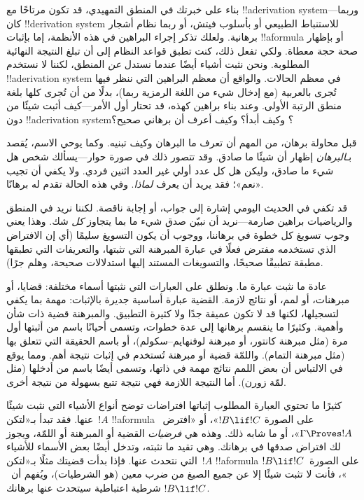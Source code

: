 \documentclass[../../../include/open-logic-section]{subfiles}
\begin{document}


بناء على خبرتك في المنطق التمهيدي، قد تكون مرتاحًا مع
!!a{derivation} system---وربما كان !!{derivation} system للاستنباط
الطبيعي أو بأسلوب فيتش، أو ربما نظام أشجار برهانية. ولعلك تذكر إجراء
البراهين في هذه الأنظمة، إما بإثبات !!a{formula} أو بإظهار صحة حجة
معطاة. ولكي تفعل ذلك، كنت تطبق قواعد النظام إلى أن تبلغ النتيجة
النهائية المطلوبة. ونحن نثبت أشياء أيضًا عندما نستدل \emph{عن}
المنطق، لكننا لا نستخدم !!a{derivation} system في معظم الحالات.
والواقع أن معظم البراهين التي ننظر فيها تُجرى بالعربية (مع إدخال شيء
من اللغة الرمزية ربما)، بدلًا من أن تُجرى كلها بلغة منطق الرتبة
الأولى. وعند بناء براهين كهذه، قد تحتار أول الأمر---كيف أثبت شيئًا من
دون !!a{derivation} system؟ وكيف أبدأ؟ وكيف أعرف أن برهاني صحيح؟

قبل محاولة برهان، من المهم أن تعرف ما البرهان وكيف تبنيه. وكما يوحي
الاسم، يُقصد بـ\emph{البرهان} إظهار أن شيئًا ما صادق. وقد تتصور ذلك
في صورة حوار---يسألك شخص هل شيء ما صادق، وليكن هل كل عدد أولي غير
العدد اثنين فردي. ولا يكفي أن تجيب «نعم»؛ فقد يريد أن يعرف
\emph{لماذا}. وفي هذه الحالة تقدم له برهانًا.

قد تكفي في الحديث اليومي إشارة إلى جواب، أو إجابة ناقصة. لكننا نريد
في المنطق والرياضيات براهين صارمة---نريد أن نبيّن صدق شيء ما بما
يتجاوز \emph{كل} شك. وهذا يعني وجوب تسويغ كل خطوة في برهاننا، ووجوب
أن يكون التسويغ سليمًا (أي إن الافتراض الذي تستخدمه مفترض فعلًا في
عبارة المبرهنة التي تثبتها، والتعريفات التي تطبقها مطبقة تطبيقًا
صحيحًا، والتسويغات المستند إليها استدلالات صحيحة، وهلم جرًا).

عادة ما نثبت عبارة ما. ونطلق على العبارات التي نثبتها أسماء مختلفة:
قضايا، أو مبرهنات، أو لمم، أو نتائج لازمة. القضية عبارة أساسية جديرة
بالإثبات: مهمة بما يكفي لتسجيلها، لكنها قد لا تكون عميقة جدًا ولا
كثيرة التطبيق. والمبرهنة قضية ذات شأن وأهمية. وكثيرًا ما ينقسم
برهانها إلى عدة خطوات، وتسمى أحيانًا باسم من أثبتها أول مرة (مثل
مبرهنة كانتور، أو مبرهنة لوفنهايم--سكولم)، أو باسم الحقيقة التي
تتعلق بها (مثل مبرهنة التمام). واللمّة قضية أو مبرهنة تُستخدم في
إثبات نتيجة أهم. ومما يوقع في الالتباس أن بعض اللمم نتائج مهمة في
ذاتها، وتسمى أيضًا باسم من أدخلها (مثل لمّة زورن). أما النتيجة
اللازمة فهي نتيجة تتبع بسهولة من نتيجة أخرى.

كثيرًا ما تحتوي العبارة المطلوب إثباتها افتراضات توضح أنواع الأشياء
التي نثبت شيئًا عنها. فقد تبدأ بـ«لتكن~$!A$ !!a{formula} على الصورة
$!B \lif !C$»، أو «افترض~$\Gamma \Proves !A$»، أو ما شابه ذلك. وهذه
هي \emph{فرضيات} القضية أو المبرهنة أو اللمّة، ويجوز لك افتراض صدقها
في برهانك. وهي تقيد ما نثبته، وتدخل أيضًا بعض الأسماء للأشياء التي
نتحدث عنها. فإذا بدأت قضيتك مثلًا بـ«لتكن~$!A$ !!a{formula} على
الصورة~$!B \lif !C$»، فأنت لا تثبت شيئًا إلا عن جميع الصيغ من ضرب
معين (هو الشرطيات)، ويُفهم أن~$!B \lif !C$ شرطية اعتباطية سيتحدث
عنها برهانك.
\end{document}
